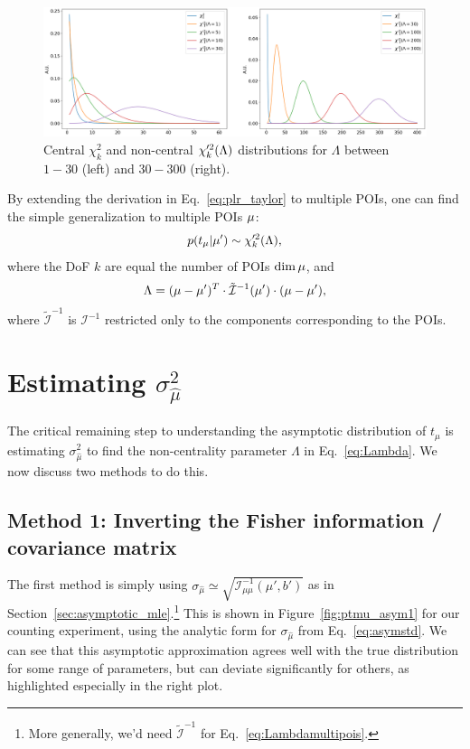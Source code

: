 \begin{figure}[htb]
  \centering
  \includegraphics[width=\textwidth]{figures/06-asymptotic-plr/1.png}
  \caption{Central $\chi^2_k$ and non-central $\chi^{\prime 2}_k(\Lambda)$ distributions for $\Lambda$ between $1-30$ (left) and $30-300$ (right).}
  \label{fig:noncentralchi2}
\end{figure}

By extending the derivation in Eq.~\ref{eq:plr_taylor} to multiple POIs, one can find the simple generalization to multiple POIs $\mathbf{\mu}$:
\begin{equation}
p(t_\mu|\mu') \sim \chi^{\prime 2}_k(\Lambda),
\label{eq:chi2multipois}
\end{equation}
where the DoF $k$ are equal the number of POIs $\dim\mathbf{\mu}$, and
\begin{equation}
\Lambda = (\mathbf{\mu} - \mathbf{\mu}')^T \cdot \tilde{\mathcal I}^{-1}(\mathbf{\mu}') \cdot (\mathbf{\mu} - \mathbf{\mu}'),
\label{eq:Lambdamultipois}
\end{equation}
where $\tilde{\mathcal I}^{-1}$ is $\mathcal I^{-1}$ restricted only to the components corresponding to the POIs.


\section{Estimating \texorpdfstring{$\sigma_{\hat\mu}^2$}{σ2}}

The critical remaining step to understanding the asymptotic distribution of $t_\mu$ is estimating $\sigma_{\hat\mu}^2$ to find the non-centrality parameter $\Lambda$ in Eq.~\ref{eq:Lambda}.
We now discuss two methods to do this.

\subsection{Method 1: Inverting the Fisher information / covariance matrix}

The first method is simply using $\sigma_{\hat\mu} \simeq \sqrt{\mathcal I^{-1}_{\mu\mu}(\mu', b')}$ as in Section~\ref{sec:asymptotic_mle}.\footnote{More generally, we'd need $\tilde{\mathcal I}^{-1}$ for Eq.~\ref{eq:Lambdamultipois}.}
This is shown in Figure~\ref{fig:ptmu_asym1} for our counting experiment, using the analytic form for $\sigma_{\hat\mu}$ from Eq.~\ref{eq:asymstd}.
We can see that this asymptotic approximation agrees well with the true distribution for some range of parameters, but can deviate significantly for others, as highlighted especially in the right plot.

